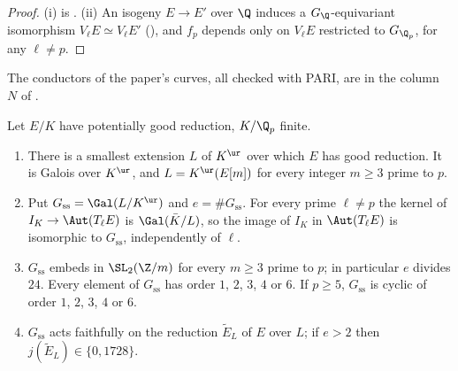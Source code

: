 \begin{proof}
(i) is . (ii) An isogeny $E\to E'$ over $\Q$ induces a $G_\Q$-equivariant
isomorphism $V_\ell E\simeq V_\ell E'$ (), and $f_p$ depends only on $V_\ell E$ restricted to $G_{\Q_p}$, for
any $\ell\ne p$.
\end{proof}

The conductors of the paper's curves, all checked with PARI, are in the column $N$ of
.

\begin{theorem}\label{thm:reduction:serre-tate}
Let $E/K$ have potentially good reduction, $K/\Q_p$ finite.
\begin{enumerate}[label=(\roman*)]
\item There is a smallest extension $L$ of $K^{\ur}$ over which $E$ has good reduction. It is Galois over $K^{\ur}$, and
$L=K^{\ur}(E[m])$ for every integer $m\ge3$ prime to $p$.
\item Put $G_{\mathrm{ss}}=\Gal(L/K^{\ur})$ and $e=\#G_{\mathrm{ss}}$. For every prime $\ell\ne p$ the kernel of
$I_K\to\Aut(T_\ell E)$ is $\Gal(\bar K/L)$, so the image of $I_K$ in $\Aut(T_\ell E)$ is isomorphic to $G_{\mathrm{ss}}$,
independently of $\ell$.
\item $G_{\mathrm{ss}}$ embeds in $\SL_2(\Z/m)$ for every $m\ge3$ prime to $p$; in particular $e$ divides $24$. Every
element of $G_{\mathrm{ss}}$ has order $1$, $2$, $3$, $4$ or $6$. If $p\ge5$, $G_{\mathrm{ss}}$ is cyclic of order $1$, $2$, $3$, $4$
or $6$.
\item $G_{\mathrm{ss}}$ acts faithfully on the reduction $\tilde E_L$ of $E$ over $L$; if $e>2$ then $j(\tilde E_L)\in\{0,1728\}$.
\end{enumerate}
\end{theorem}

